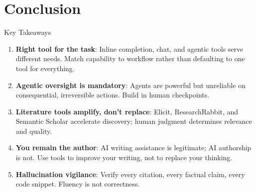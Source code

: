 
\section{Conclusion}

\begin{frame}{Key Takeaways}
  \begin{enumerate}
    \item \textbf{Right tool for the task}: Inline completion, chat, and agentic tools serve different needs. Match capability to workflow rather than defaulting to one tool for everything.

    \vspace{0.4em}
    \item \textbf{Agentic oversight is mandatory}: Agents are powerful but unreliable on consequential, irreversible actions. Build in human checkpoints.

    \vspace{0.4em}
    \item \textbf{Literature tools amplify, don't replace}: Elicit, ResearchRabbit, and Semantic Scholar accelerate discovery; human judgment determines relevance and quality.

    \vspace{0.4em}
    \item \textbf{You remain the author}: AI writing assistance is legitimate; AI authorship is not. Use tools to improve your writing, not to replace your thinking.

    \vspace{0.4em}
    \item \textbf{Hallucination vigilance}: Verify every citation, every factual claim, every code snippet. Fluency is not correctness.
  \end{enumerate}
\end{frame}

